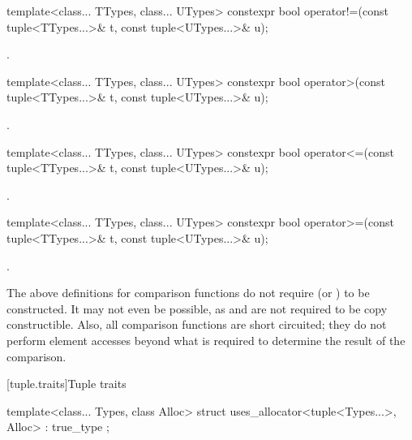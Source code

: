 %
\begin{itemdecl}
template<class... TTypes, class... UTypes>
  constexpr bool operator!=(const tuple<TTypes...>& t, const tuple<UTypes...>& u);
\end{itemdecl}
\begin{itemdescr}
\pnum\returns {}.
\end{itemdescr}

%
\begin{itemdecl}
template<class... TTypes, class... UTypes>
  constexpr bool operator>(const tuple<TTypes...>& t, const tuple<UTypes...>& u);
\end{itemdecl}
\begin{itemdescr}
\pnum\returns {}.
\end{itemdescr}

%
\begin{itemdecl}
template<class... TTypes, class... UTypes>
  constexpr bool operator<=(const tuple<TTypes...>& t, const tuple<UTypes...>& u);
\end{itemdecl}
\begin{itemdescr}
\pnum\returns {}.
\end{itemdescr}

%
\begin{itemdecl}
template<class... TTypes, class... UTypes>
  constexpr bool operator>=(const tuple<TTypes...>& t, const tuple<UTypes...>& u);
\end{itemdecl}

\begin{itemdescr}
\pnum\returns {}.
\end{itemdescr}

\pnum \begin{note} The above definitions for comparison functions
do not require 
(or ) to be constructed. It may not
even be possible, as  and  are not required to be copy
constructible. Also, all comparison functions are short circuited;
they do not perform element accesses beyond what is required to determine the
result of the comparison. \end{note}

[tuple.traits]{Tuple traits}

%
\begin{itemdecl}
template<class... Types, class Alloc>
  struct uses_allocator<tuple<Types...>, Alloc> : true_type { };
\end{itemdecl}

